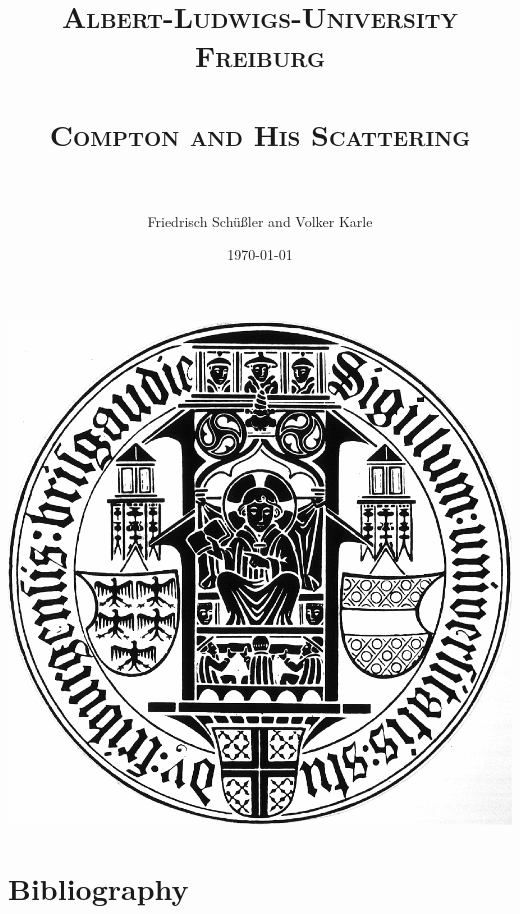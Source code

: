 \documentclass[paper=a4, fontsize=12pt, xcolor=dvipsnames]{scrartcl} %
\title{
\normalfont \normalsize 
\textsc{Albert-Ludwigs-University Freiburg} \\ [25pt] %
\horrule{0.5pt} \\[0.4cm] %
\huge \textsc{Compton and His Scattering} \\ %
\horrule{2pt} \\[0.5cm] %
}
\author{Friedrisch Schüßler and Volker Karle} %
\date{\normalsize\today} %
\numberwithin{equation}{section} %
\numberwithin{figure}{section} %
\numberwithin{table}{section} %
\begin{document}
\color{gray1}
\maketitle
\begin{center}
 \includegraphics[width=0.6\linewidth]{figures/unifreiburg}
\end{center}
\thispagestyle{empty}
\newpage
    {\pagestyle{plain}
    \thispagestyle{empty}
    \tableofcontents
    \thispagestyle{empty}
    \cleardoublepage}
\newpage


\setcounter{page}{1}





\clearpage
\section{Bibliography}
\printbibliography[heading=subbibintoc]
\clearpage
\end{document}
